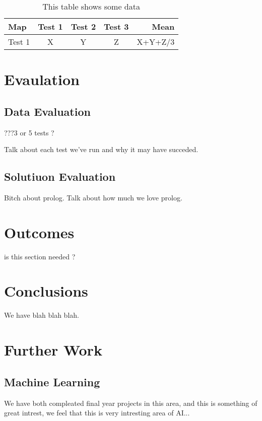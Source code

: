\documentclass[a4paper,oneside]{report}
\begin{document}
	
	\begin{table}[htbp]
		\centering
		\begin{tabular}{| l | c | c | c | r |}
		\hline
			Map & Test 1 & Test 2 & Test 3 & Mean \\ \hline
			Test 1 &  X & Y & Z & X+Y+Z/3 \\ \hline
		\end{tabular}
		\caption{This table shows some data}
		\label{tab:myfirsttable}
	\end{table}
	
	
\section{Evaulation}



\subsection{Data Evaluation}
	
	
	???3 or 5 tests ? 

	
	Talk about each test we've run and why it may have succeded.
	
\subsection{Solutiuon Evaluation}
	
	Bitch about prolog. Talk about how much we love prolog.
	
\section{Outcomes}
is this section needed ? 

\section{Conclusions}

We have blah blah blah.

\section{Further Work}

	\subsection{Machine Learning}
		We have both compleated final year projects in this area, and this is something of great intrest, we feel that this is very intresting area of AI...
\end{document}

